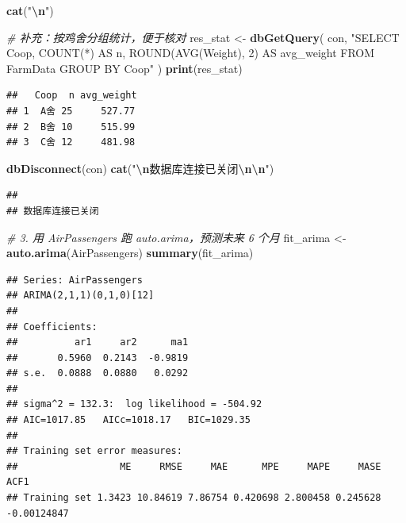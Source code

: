 \documentclass[
]{ctexart}
\newenvironment{Shaded}{\begin{snugshade}}{\end{snugshade}}
\newcommand{\CommentTok}[1]{\textcolor[rgb]{0.56,0.35,0.01}{\textit{#1}}}
\newcommand{\FunctionTok}[1]{\textcolor[rgb]{0.13,0.29,0.53}{\textbf{#1}}}
\newcommand{\NormalTok}[1]{#1}
\newcommand{\OtherTok}[1]{\textcolor[rgb]{0.56,0.35,0.01}{#1}}
\newcommand{\SpecialCharTok}[1]{\textcolor[rgb]{0.81,0.36,0.00}{\textbf{#1}}}
\newcommand{\StringTok}[1]{\textcolor[rgb]{0.31,0.60,0.02}{#1}}
\begin{document}
\begin{Shaded}
\begin{Highlighting}[]
\FunctionTok{cat}\NormalTok{(}\StringTok{"}\SpecialCharTok{\textbackslash{}n}\StringTok{"}\NormalTok{)}
\end{Highlighting}
\end{Shaded}

\begin{Shaded}
\begin{Highlighting}[]
\CommentTok{\# 补充：按鸡舍分组统计，便于核对}
\NormalTok{res\_stat }\OtherTok{\textless{}{-}} \FunctionTok{dbGetQuery}\NormalTok{(}
\NormalTok{  con,}
  \StringTok{"SELECT Coop, COUNT(*) AS n, ROUND(AVG(Weight), 2) AS avg\_weight}
\StringTok{   FROM FarmData GROUP BY Coop"}
\NormalTok{)}
\FunctionTok{print}\NormalTok{(res\_stat)}
\end{Highlighting}
\end{Shaded}

\begin{verbatim}
##   Coop  n avg_weight
## 1  A舍 25     527.77
## 2  B舍 10     515.99
## 3  C舍 12     481.98
\end{verbatim}

\begin{Shaded}
\begin{Highlighting}[]
\FunctionTok{dbDisconnect}\NormalTok{(con)}
\FunctionTok{cat}\NormalTok{(}\StringTok{"}\SpecialCharTok{\textbackslash{}n}\StringTok{数据库连接已关闭}\SpecialCharTok{\textbackslash{}n\textbackslash{}n}\StringTok{"}\NormalTok{)}
\end{Highlighting}
\end{Shaded}

\begin{verbatim}
## 
## 数据库连接已关闭
\end{verbatim}

\begin{Shaded}
\begin{Highlighting}[]
\CommentTok{\# 3. 用 AirPassengers 跑 auto.arima，预测未来 6 个月}
\NormalTok{fit\_arima }\OtherTok{\textless{}{-}} \FunctionTok{auto.arima}\NormalTok{(AirPassengers)}
\FunctionTok{summary}\NormalTok{(fit\_arima)}
\end{Highlighting}
\end{Shaded}

\begin{verbatim}
## Series: AirPassengers 
## ARIMA(2,1,1)(0,1,0)[12] 
## 
## Coefficients:
##          ar1     ar2      ma1
##       0.5960  0.2143  -0.9819
## s.e.  0.0888  0.0880   0.0292
## 
## sigma^2 = 132.3:  log likelihood = -504.92
## AIC=1017.85   AICc=1018.17   BIC=1029.35
## 
## Training set error measures:
##                  ME     RMSE     MAE      MPE     MAPE     MASE        ACF1
## Training set 1.3423 10.84619 7.86754 0.420698 2.800458 0.245628 -0.00124847
\end{verbatim}
\end{document}

